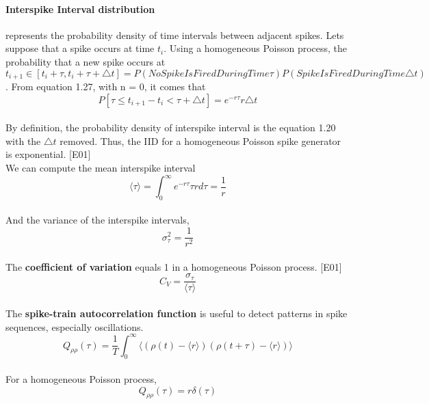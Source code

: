 \documentclass{report}
\begin{document}
\paragraph{Interspike Interval distribution } represents the probability density of time intervals between adjacent spikes. Lets suppose that a spike occurs at time $t_{i}$. Using a homogeneous Poisson process, the probability that a new spike occurs at $t_{i+1} \in [t_{i}+\tau,t_{i}+\tau+\triangle t] = P(No Spike Is Fired During Time \tau)P(Spike Is Fired During Time \triangle t)$. From equation 1.27, with n = 0, it comes that
\begin{equation}
P[\tau \leq t_{i+1}-t_{i}<\tau + \triangle t]=e^{-r\tau}r\triangle t
\end{equation}
\\By definition, the probability density of interspike interval is the equation 1.20 with the $\triangle t$ removed. Thus, the IID for a homogeneous Poisson spike generator is exponential. {\color{blue} [E01]}
\\We can compute the mean interspike interval
\begin{equation}
\langle \tau \rangle = \int_{0}^{\infty}e^{-r\tau}\tau r d\tau = \frac{1}{r}
\end{equation}
\\And the variance of the interspike intervals,
\begin{equation}
\sigma_{\tau}^{2}=\frac{1}{r^{2}}
\end{equation}
\\The \textbf{coefficient of variation} equals 1 in a homogeneous Poisson process. {\color{blue} [E01]}
\begin{equation}
C_{V} = \frac{\sigma_{\tau}}{\langle \tau \rangle}
\end{equation}
\\The \textbf{spike-train autocorrelation function} is useful to detect patterns in spike sequences, especially oscillations. 
\begin{equation}
Q_{\rho \rho}(\tau) = \frac{1}{T}\int_{0}^{\infty}\langle(\rho(t)-\langle r \rangle)(\rho(t+\tau)-\langle r \rangle)\rangle
\end{equation}
\\For a homogeneous Poisson process, 
\begin{equation}
Q_{\rho \rho}(\tau) = r\delta(\tau)
\end{equation}
\end{document}
